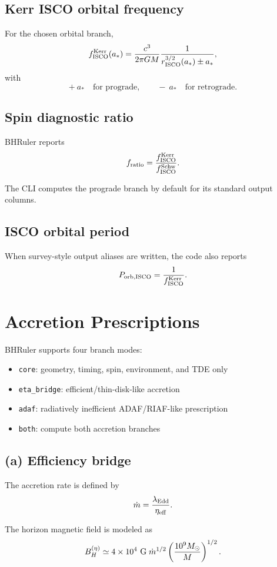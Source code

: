 \documentclass[12pt]{article}
\begin{document}
\subsection*{Kerr ISCO orbital frequency}
For the chosen orbital branch,
\[
f_{\rm ISCO}^{\rm Kerr}(a_*) =
\frac{c^3}{2\pi GM}
\frac{1}{r_{\rm ISCO}^{3/2}(a_*) \pm a_*},
\]
with
\[
+\ a_* \quad \text{for prograde},
\qquad
-\ a_* \quad \text{for retrograde}.
\]

\subsection*{Spin diagnostic ratio}
BHRuler reports
\[
f_{\rm ratio}
=
\frac{f_{\rm ISCO}^{\rm Kerr}}{f_{\rm ISCO}^{\rm Schw}}.
\]

The CLI computes the prograde branch by default for its standard output columns.

\subsection*{ISCO orbital period}
When survey-style output aliases are written, the code also reports
\[
P_{\rm orb,ISCO} = \frac{1}{f_{\rm ISCO}^{\rm Kerr}}.
\]

\section{Accretion Prescriptions}

BHRuler supports four branch modes:
\begin{itemize}
    \item \texttt{core}: geometry, timing, spin, environment, and TDE only
    \item \texttt{eta\_bridge}: efficient/thin-disk-like accretion
    \item \texttt{adaf}: radiatively inefficient ADAF/RIAF-like prescription
    \item \texttt{both}: compute both accretion branches
\end{itemize}

\subsection*{(a) Efficiency bridge}
The accretion rate is defined by
\[
\dot m = \frac{\lambda_{\rm Edd}}{\eta_{\rm eff}}.
\]

The horizon magnetic field is modeled as
\[
B_H^{(\eta)} \simeq 4\times10^4\ {\rm G}\;
\dot m^{1/2}
\left(\frac{10^9 M_\odot}{M}\right)^{1/2}.
\]
\end{document}
